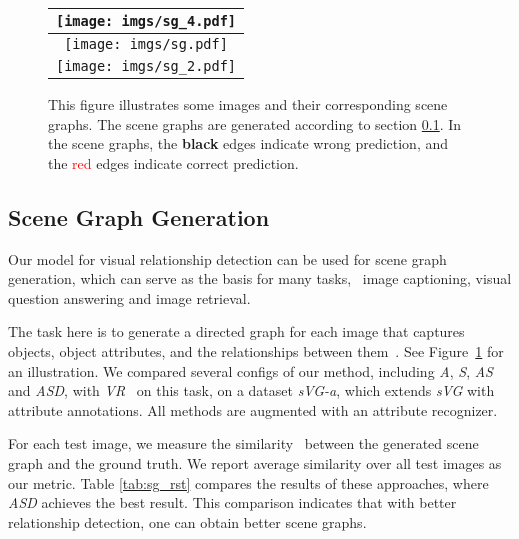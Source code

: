 \begin{figure}
    \centering
\begin{tabular}{c}
    \toprule
    \texttt{[image: imgs/sg\_4.pdf]} \\
    \hline
    \texttt{[image: imgs/sg.pdf]} \\
    \hline
    \texttt{[image: imgs/sg\_2.pdf]} \\
\bottomrule
    \end{tabular}
    \caption{\small This figure illustrates some images and their corresponding scene graphs.
	The scene graphs are generated according to section \ref{sec:sg}.
        In the scene graphs, the \textbf{black} edges indicate wrong prediction,
        and the \textcolor{red}{red} edges indicate correct prediction.}
    \label{fig:sg_sample}
    \vspace{-1.5mm}
\end{figure}

\subsection{Scene Graph Generation}
\label{sec:sg}

Our model for visual relationship detection can be used for scene graph generation,
which can serve as the basis for many tasks,
\eg~image captioning\cite{anderson2016spice, aditya2015images},
visual question answering\cite{wu2016visual} and image retrieval\cite{johnson2015image}.

The task here is to generate a directed graph for each image
that captures objects, object attributes, and the relationships between them~\cite{johnson2015image}.
See Figure~\ref{fig:sg_sample} for an illustration.
We compared several configs of our method, including \emph{A}, \emph{S}, \emph{AS} and \emph{ASD},
with \emph{VR}~\cite{lu2016visual} on this task,
on a dataset \emph{sVG-a}, which extends \emph{sVG} with attribute annotations.
All methods are augmented with an attribute recognizer.


For each test image, we measure the similarity~\cite{champin2003measuring} between the generated scene graph and the ground truth.
We report average similarity over all test images as our metric.
Table \ref{tab:sg_rst} compares the results of these approaches,
where \emph{ASD} achieves the best result.
This comparison indicates that
with better relationship detection, one can obtain better scene graphs.
